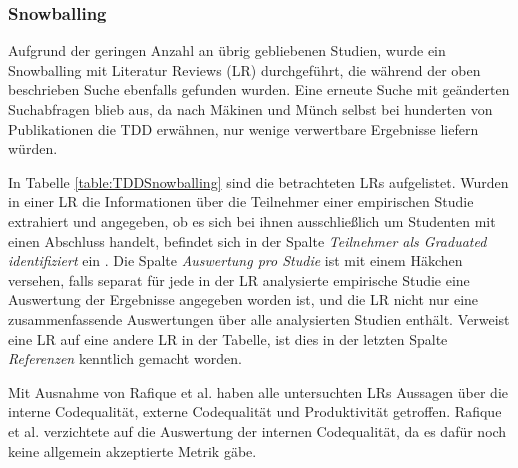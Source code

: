 \subsubsection{Snowballing} \label{sec:TDDMethodeSnow}

Aufgrund der geringen Anzahl an übrig gebliebenen Studien, wurde ein Snowballing mit Literatur Reviews (LR) durchgeführt, die während der oben beschrieben Suche ebenfalls gefunden wurden. Eine erneute Suche mit geänderten Suchabfragen blieb aus, da nach Mäkinen und Münch \cite{Makinen2014EffectsStudies} selbst bei hunderten von Publikationen die TDD erwähnen, nur wenige verwertbare Ergebnisse liefern würden.

In Tabelle \ref{table:TDDSnowballing} sind die betrachteten LRs aufgelistet. Wurden in einer LR die Informationen über die Teilnehmer einer empirischen Studie extrahiert und angegeben, ob es sich bei ihnen ausschließlich um Studenten mit einen Abschluss handelt, befindet sich in der Spalte \textit{Teilnehmer als Graduated identifiziert} ein \checkmark. Die Spalte \textit{Auswertung pro Studie} ist mit einem Häkchen versehen, falls separat für jede in der LR analysierte empirische Studie eine Auswertung der Ergebnisse angegeben worden ist, und die LR nicht nur eine zusammenfassende Auswertungen über alle analysierten Studien enthält. Verweist eine LR auf eine andere LR in der Tabelle, ist dies in der letzten Spalte \textit{Referenzen} kenntlich gemacht worden.

Mit Ausnahme von Rafique et al. \cite{Rafique2013TheMeta-Analysis} haben alle untersuchten LRs Aussagen über die interne Codequalität, externe Codequalität und Produktivität getroffen. Rafique et al. \cite{Rafique2013TheMeta-Analysis} verzichtete auf die Auswertung der internen Codequalität, da es dafür noch keine allgemein akzeptierte Metrik gäbe.

